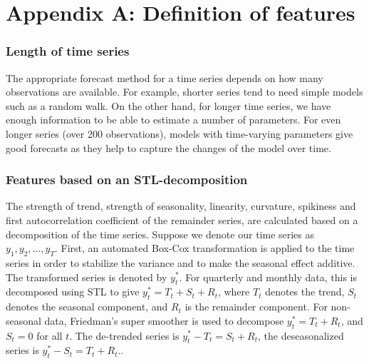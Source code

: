 \documentclass[11pt,a4paper,]{article}
\begin{document}
\hypertarget{appendix-a-definition-of-features}{%
\section*{Appendix A: Definition of features}\label{appendix-a-definition-of-features}}

\hypertarget{length-of-time-series}{%
\subsubsection*{Length of time series}\label{length-of-time-series}}

The appropriate forecast method for a time series depends on how many observations are available. For example, shorter series tend to need simple models such as a random walk. On the other hand, for longer time series, we have enough information to be able to estimate a number of parameters. For even longer series (over 200 observations), models with time-varying parameters give good forecasts as they help to capture the changes of the model over time.

\hypertarget{features-based-on-an-stl-decomposition}{%
\subsubsection*{Features based on an STL-decomposition}\label{features-based-on-an-stl-decomposition}}

The strength of trend, strength of seasonality, linearity, curvature, spikiness and first autocorrelation coefficient of the remainder series, are calculated based on a decomposition of the time series. Suppose we denote our time series as \(y_1, y_2, \dots,y_T\). First, an automated Box-Cox transformation \autocite{Guerrero1993} is applied to the time series in order to stabilize the variance and to make the seasonal effect additive. The transformed series is denoted by \(y_{t}^*\). For quarterly and monthly data, this is decomposed using STL \autocite{cleveland1990stl} to give \(y_t^*=T_t+S_t+R_t\), where \(T_t\) denotes the trend, \(S_t\) denotes the seasonal component, and \(R_t\) is the remainder component. For non-seasonal data, Friedman's super smoother \autocite{supsmu} is used to decompose \(y_t^*=T_t+R_t\), and \(S_t=0\) for all \(t\). The de-trended series is \(y_t^*-T_t=S_t+R_t\), the deseasonalized series is \(y_t^*-S_t = T_t+R_t\)..
\end{document}
